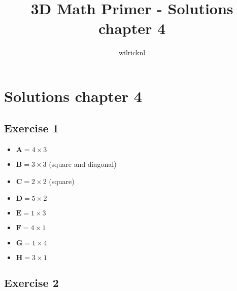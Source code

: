 \documentclass[11pt]{article}
\author{wilricknl}
\title{3D Math Primer - Solutions chapter 4}
\begin{document}
\maketitle

\section{Solutions chapter 4}

\subsection{Exercise 1}

\begin{itemize}
	\item $\textbf{A}=4 \times 3$
	\item $\textbf{B}=3 \times 3$ (square and diagonal)
	\item $\textbf{C}=2 \times 2$ (square)
	\item $\textbf{D}=5 \times 2$
	\item $\textbf{E}=1 \times 3$
	\item $\textbf{F}=4 \times 1$
	\item $\textbf{G}=1 \times 4$
	\item $\textbf{H}=3 \times 1$
\end{itemize}

\subsection{Exercise 2}
\end{document}
